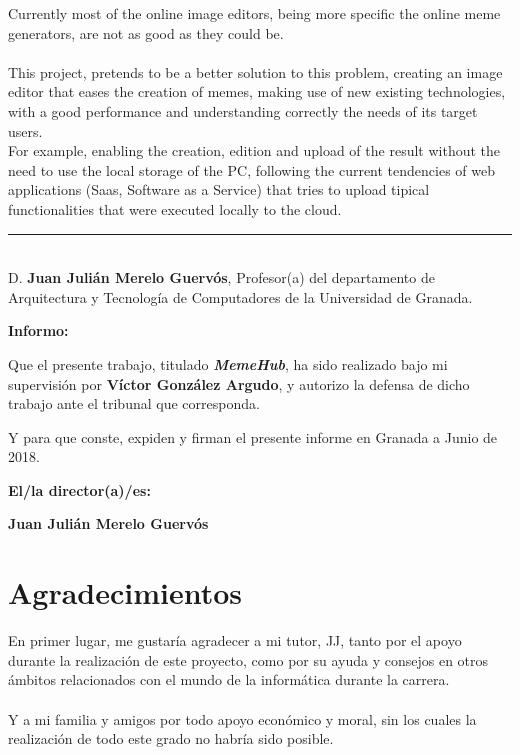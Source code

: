 	Currently most of the online image editors, being more specific the online meme generators, are
	not as good as they could be. 
	\\\\
	This project, pretends to be a better solution to this problem, creating an image editor that
	eases the creation of memes, making use of new existing technologies, with a good performance
	and understanding correctly the needs of its target users.
	\\
	For example, enabling the creation, edition and upload of the result without the need to use
	the local storage of the PC, following the current tendencies of web applications (Saas, Software as a Service)
	that tries to upload tipical functionalities that were executed locally to the cloud.

\cleardoublepage

\thispagestyle{empty}

\noindent\rule[-1ex]{\textwidth}{2pt}\\[4.5ex]

D. \textbf{Juan Julián Merelo Guervós}, Profesor(a) del departamento de Arquitectura y Tecnología de 
Computadores de la Universidad de Granada.

\vspace{0.5cm}

\textbf{Informo:}

\vspace{0.5cm}

Que el presente trabajo, titulado \textit{\textbf{MemeHub}},
ha sido realizado bajo mi supervisión por \textbf{Víctor González Argudo}, y autorizo la defensa de dicho trabajo ante el tribunal
que corresponda.

\vspace{0.5cm}

Y para que conste, expiden y firman el presente informe en Granada a Junio de 2018.

\vspace{1cm}

\textbf{El/la director(a)/es: }

\vspace{5cm}

\noindent \textbf{Juan Julián Merelo Guervós}

\chapter*{Agradecimientos}

En primer lugar, me gustaría agradecer a mi tutor, JJ, tanto por el apoyo durante la realización
de este proyecto, como por su ayuda y consejos en otros ámbitos relacionados con el mundo de la 
informática durante la carrera.
\\\\
Y a mi familia y amigos por todo apoyo económico y moral, sin los cuales la realización 
de todo este grado no habría sido posible.

